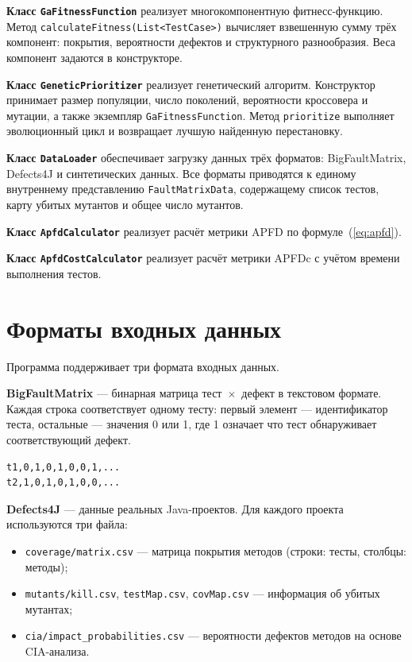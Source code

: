 \textbf{Класс \texttt{GaFitnessFunction}} реализует многокомпонентную фитнесс-функцию. 
Метод \texttt{calculateFitness(List<TestCase>)} вычисляет взвешенную сумму трёх компонент: покрытия, 
вероятности дефектов и структурного разнообразия. Веса компонент задаются в конструкторе.

\textbf{Класс \texttt{GeneticPrioritizer}} реализует генетический алгоритм. Конструктор принимает размер 
популяции, число поколений, вероятности кроссовера и мутации, а также экземпляр \texttt{GaFitnessFunction}.
Метод \texttt{prioritize} выполняет эволюционный цикл и возвращает лучшую найденную перестановку.

\textbf{Класс \texttt{DataLoader}} обеспечивает загрузку данных трёх форматов: BigFaultMatrix, Defects4J 
и синтетических данных. Все форматы приводятся к единому внутреннему представлению \texttt{FaultMatrixData},
содержащему список тестов, карту убитых мутантов и общее число мутантов.

\textbf{Класс \texttt{ApfdCalculator}} реализует расчёт метрики APFD по формуле~(\ref{eq:apfd}). 

\textbf{Класс \texttt{ApfdCostCalculator}} реализует расчёт метрики APFDc с учётом времени выполнения 
тестов.

\section{Форматы входных данных} \label{ch5:sec3}

Программа поддерживает три формата входных данных.

\textbf{BigFaultMatrix} --- бинарная матрица тест~$\times$~дефект в текстовом формате. 
Каждая строка соответствует одному тесту: первый элемент --- идентификатор теста, остальные --- значения 0 
или 1, где 1 означает что тест обнаруживает соответствующий дефект.

\begin{lstlisting}[caption={Фрагмент BigFaultMatrix}]
t1,0,1,0,1,0,0,1,...
t2,1,0,1,0,1,0,0,...
\end{lstlisting}

\textbf{Defects4J} --- данные реальных Java-проектов. Для каждого проекта используются три файла:
\begin{itemize}
    \item \texttt{coverage/matrix.csv} --- матрица покрытия методов (строки: тесты, столбцы: методы);
    \item \texttt{mutants/kill.csv}, \texttt{testMap.csv}, \texttt{covMap.csv} --- информация об убитых мутантах;
    \item \texttt{cia/impact\_probabilities.csv} --- вероятности дефектов методов на основе CIA-анализа.
\end{itemize}

